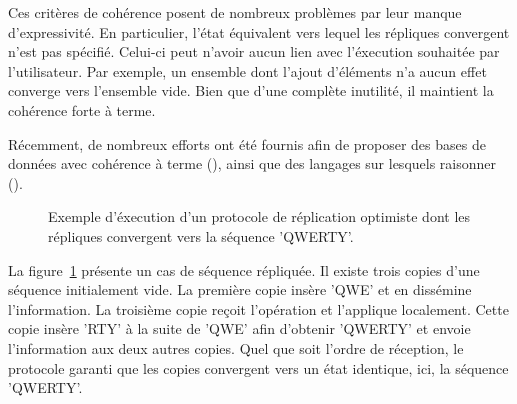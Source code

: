 Ces critères de cohérence posent de nombreux problèmes par leur manque
d'expressivité. En particulier, l'état équivalent vers lequel les répliques
convergent n'est pas spécifié. Celui-ci peut n'avoir aucun lien avec l'éxecution
souhaitée par l'utilisateur. Par exemple, un ensemble dont l'ajout d'éléments
n'a aucun effet converge vers l'ensemble vide. Bien que d'une complète
inutilité, il maintient la cohérence forte à terme.

Récemment, de nombreux efforts ont été fournis afin de proposer des bases de
données avec cohérence à terme (\REF), ainsi que des langages sur lesquels
raisonner (\REF).

\begin{figure}
  \centering
  
  \caption{\label{repl:fig:eventualconsistencyexample} Exemple d'éxecution d'un protocole
    de réplication optimiste dont les répliques convergent vers la séquence
    'QWERTY'.}
\end{figure}

La figure~\ref{repl:fig:eventualconsistencyexample} présente un cas de séquence
répliquée.  Il existe trois copies d'une séquence initialement vide. La première
copie insère 'QWE' et en dissémine l'information. La troisième copie reçoit
l'opération et l'applique localement. Cette copie insère 'RTY' à la suite de
'QWE' afin d'obtenir 'QWERTY' et envoie l'information aux deux autres
copies. Quel que soit l'ordre de réception, le protocole garanti que les copies
convergent vers un état identique, ici, la séquence 'QWERTY'.


